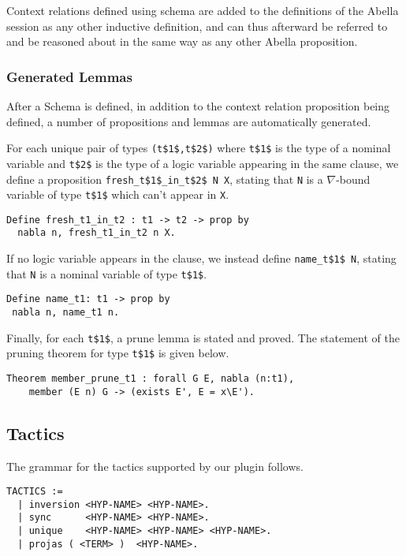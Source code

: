 \documentclass[nocopyrightspace,authoryear]{sigplanconf}
\begin{document}
Context relations defined using schema are added to the definitions of the Abella session as any other inductive definition, and can thus afterward be referred to and be reasoned about in the same way as any other Abella proposition.

\subsubsection{Generated Lemmas}

After a Schema is defined, in addition to the context relation proposition being defined, a number of propositions and lemmas are automatically generated.

For each unique pair of types \lstinline|(t$1$,t$2$)| where \lstinline|t$1$| is the type of a nominal variable and \lstinline|t$2$| is the type of a logic variable appearing in the same clause, we define a proposition \lstinline|fresh_t$1$_in_t$2$ N X|, stating that \lstinline|N| is a $\nabla$-bound variable of type \lstinline|t$1$| which can't appear in \lstinline|X|.

\begin{lstlisting}
Define fresh_t1_in_t2 : t1 -> t2 -> prop by
  nabla n, fresh_t1_in_t2 n X.
\end{lstlisting}

If no logic variable appears in the clause, we instead define \lstinline|name_t$1$ N|, stating that \lstinline|N| is a nominal variable of type \lstinline|t$1$|.

\begin{lstlisting}
Define name_t1: t1 -> prop by
 nabla n, name_t1 n.
\end{lstlisting}

Finally, for each \lstinline|t$1$|, a prune lemma is stated and proved. The statement of the pruning theorem for type \lstinline|t$1$| is given below.
\begin{lstlisting}
Theorem member_prune_t1 : forall G E, nabla (n:t1), 
    member (E n) G -> (exists E', E = x\E').
\end{lstlisting}

\subsection{Tactics}
The grammar for the tactics supported by our plugin follows.
\begin{lstlisting}
TACTICS :=
  | inversion <HYP-NAME> <HYP-NAME>.
  | sync      <HYP-NAME> <HYP-NAME>.
  | unique    <HYP-NAME> <HYP-NAME> <HYP-NAME>.
  | projas ( <TERM> )  <HYP-NAME>.
\end{lstlisting}
\end{document}
